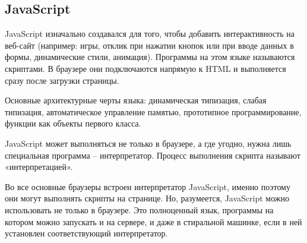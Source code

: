 \subsection{JavaScript}

JavaScript изначально создавался для того, чтобы добавить интерактивность на веб-сайт (например: игры, отклик при нажатии кнопок или при вводе данных в формы, динамические стили, анимация). Программы на этом языке называются скриптами. В браузере они подключаются напрямую к HTML и выполняется сразу после загрузки страницы.

Основные архитектурные черты языка: динамическая типизация, слабая типизация, автоматическое управление памятью, прототипное программирование, функции как объекты первого класса.

JavaScript может выполняться не только в браузере, а где угодно, нужна лишь специальная программа – интерпретатор. Процесс выполнения скрипта называют «интерпретацией».

Во все основные браузеры встроен интерпретатор JavaScript, именно поэтому они могут выполнять скрипты на странице. Но, разумеется, JavaScript можно использовать не только в браузере. Это полноценный язык, программы на котором можно запускать и на сервере, и даже в стиральной машинке, если в ней установлен соответствующий интерпретатор.